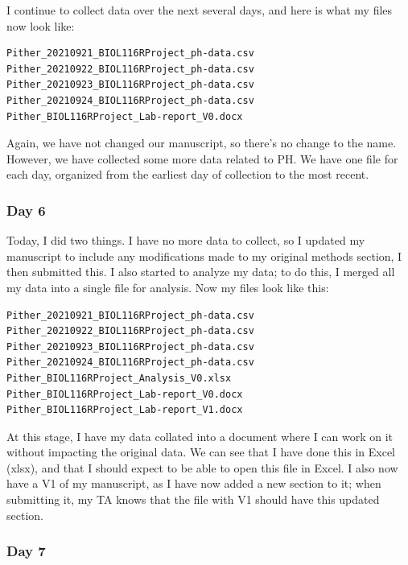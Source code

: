 \documentclass[
]{book}
\begin{document}
I continue to collect data over the next several days, and here is what my files now look like:

\begin{verbatim}
Pither_20210921_BIOL116RProject_ph-data.csv
Pither_20210922_BIOL116RProject_ph-data.csv
Pither_20210923_BIOL116RProject_ph-data.csv
Pither_20210924_BIOL116RProject_ph-data.csv
Pither_BIOL116RProject_Lab-report_V0.docx
\end{verbatim}

Again, we have not changed our manuscript, so there's no change to the name. However, we have collected some more data related to PH. We have one file for each day, organized from the earliest day of collection to the most recent.

\hypertarget{day-6}{%
\subsubsection*{Day 6}\label{day-6}}

Today, I did two things. I have no more data to collect, so I updated my manuscript to include any modifications made to my original methods section, I then submitted this. I also started to analyze my data; to do this, I merged all my data into a single file for analysis. Now my files look like this:

\begin{verbatim}
Pither_20210921_BIOL116RProject_ph-data.csv
Pither_20210922_BIOL116RProject_ph-data.csv
Pither_20210923_BIOL116RProject_ph-data.csv
Pither_20210924_BIOL116RProject_ph-data.csv
Pither_BIOL116RProject_Analysis_V0.xlsx
Pither_BIOL116RProject_Lab-report_V0.docx
Pither_BIOL116RProject_Lab-report_V1.docx
\end{verbatim}

At this stage, I have my data collated into a document where I can work on it without impacting the original data. We can see that I have done this in Excel (xlsx), and that I should expect to be able to open this file in Excel. I also now have a V1 of my manuscript, as I have now added a new section to it; when submitting it, my TA knows that the file with V1 should have this updated section.

\hypertarget{day-7}{%
\subsubsection*{Day 7}\label{day-7}}
\end{document}
